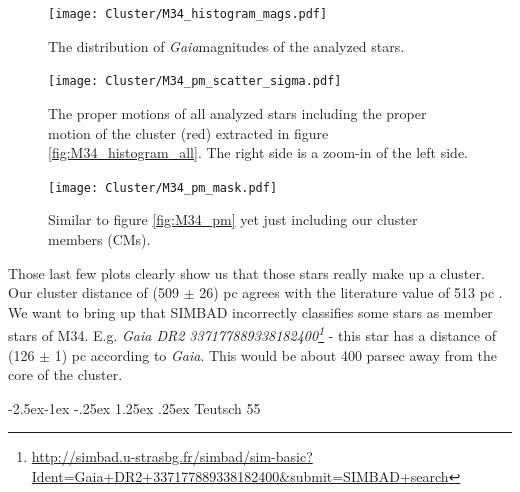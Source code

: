 \documentclass{article}
\makeatletter
\renewcommand\paragraph{\@startsection{paragraph}{4}{\z@}%
            {-2.5ex\@plus -1ex \@minus -.25ex}%
            {1.25ex \@plus .25ex}%
            {\normalfont\normalsize\bfseries}}
\makeatother
\begin{document}
\begin{figure}[H]
  \centering
    \texttt{[image: Cluster/M34\_histogram\_mags.pdf]}
  \caption{The distribution of \textit{Gaia}magnitudes of the analyzed stars.}
  \label{fig:M34_histogram_mags}
\end{figure}

\begin{figure}[H]
  \centering
    \texttt{[image: Cluster/M34\_pm\_scatter\_sigma.pdf]}
  \caption{The proper motions of all analyzed stars including the proper motion of the cluster (red) extracted in figure \ref{fig:M34_histogram_all}. The right side is a zoom-in of the left side.}
  \label{fig:M34_pm_scatter_sigma}
\end{figure}

\begin{figure}[H]
  \centering
    \texttt{[image: Cluster/M34\_pm\_mask.pdf]}
  \caption{Similar to figure \ref{fig:M34_pm} yet just including our cluster members (CMs).}
  \label{fig:M34_pm_mask}
\end{figure}

Those last few plots clearly show us that those stars really make up a cluster. Our cluster distance of (509 $\pm$ 26) pc agrees with the literature value of 513 pc \cite{Cantat2018}. We want to bring up that SIMBAD incorrectly classifies some stars as member stars of M34. E.g. \textit{Gaia DR2 337177889338182400\footnote{\url{http://simbad.u-strasbg.fr/simbad/sim-basic?Ident=Gaia+DR2+337177889338182400&submit=SIMBAD+search}}} - this star has a distance of (126 $\pm$ 1) pc according to \textit{Gaia}. This would be about 400 parsec away from the core of the cluster. 

\paragraph{Teutsch 55}
\end{document}

